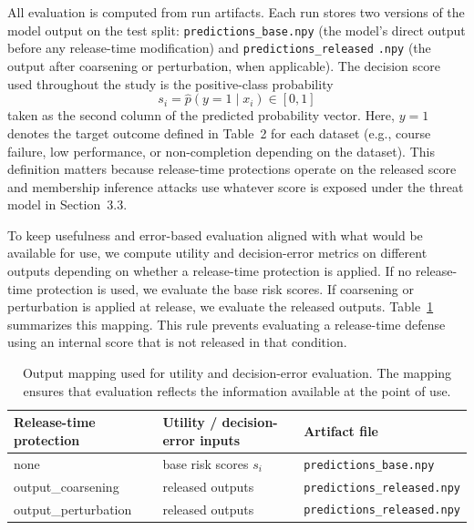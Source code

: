 \documentclass{edm_article}
\begin{document}
All evaluation is computed from run artifacts. Each run stores two versions of the model output on the test split: \texttt{predictions\_base.npy} (the model's direct output before any release-time modification) and \texttt{predictions\_released} \texttt{.npy} (the output after coarsening or perturbation, when applicable). The decision score used throughout the study is the positive-class probability
\begin{equation}
s_i = \hat{p}(y{=}1 \mid x_i)\in[0,1]
\end{equation}
taken as the second column of the predicted probability vector. Here, $y{=}1$ denotes the target outcome defined in Table~2 for each dataset (e.g., course failure, low performance, or non-completion depending on the dataset). This definition matters because release-time protections operate on the released score and membership inference attacks use whatever score is exposed under the threat model in Section~3.3.

To keep usefulness and error-based evaluation aligned with what would be available for use, we compute utility and decision-error metrics on different outputs depending on whether a release-time protection is applied. If no release-time protection is used, we evaluate the base risk scores. If coarsening or perturbation is applied at release, we evaluate the released outputs. Table~\ref{tab:eval-output-mapping} summarizes this mapping. This rule prevents evaluating a release-time defense using an internal score that is not released in that condition.

\begin{table}[t]
\centering
\caption{Output mapping used for utility and decision-error evaluation. The mapping ensures that evaluation reflects the information available at the point of use.}
\label{tab:eval-output-mapping}
\setlength{\tabcolsep}{6pt}
\begin{tabularx}{\textwidth}{@{}X X X@{}}
\toprule
Release-time protection & Utility / decision-error inputs & Artifact file \\
\midrule
none & base risk scores $s_i$ & \texttt{predictions\_base.npy} \\
output\_coarsening & released outputs & \texttt{predictions\_released.npy} \\
output\_perturbation & released outputs & \texttt{predictions\_released.npy} \\
\bottomrule
\end{tabularx}
\end{table}
\end{document}

